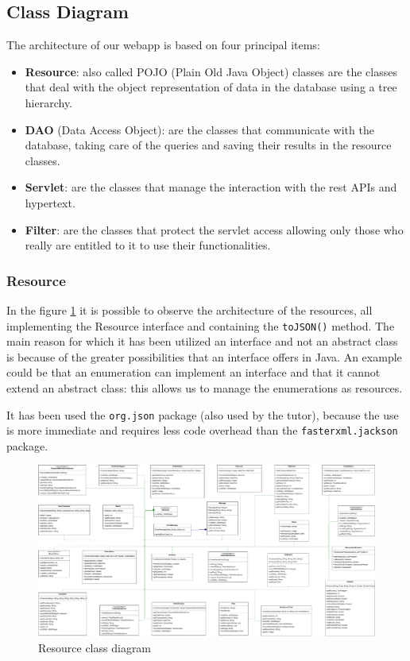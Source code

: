 \subsection{Class Diagram}

The architecture of our webapp is based on four principal items:
\begin{itemize}
    \item \textbf{Resource}: also called POJO (Plain Old Java Object) classes are the classes that deal with the object representation of data in the database using a tree hierarchy.
    \item \textbf{DAO} (Data Access Object): are the classes that communicate with the database, taking care of the queries and saving their results in the resource classes.
    \item \textbf{Servlet}: are the classes that manage the interaction with the rest APIs and hypertext.
    \item \textbf{Filter}: are the classes that protect the servlet access allowing only those who really are entitled to it to use their functionalities.
\end{itemize}

\subsubsection*{Resource}

In the figure \ref{fig:ResouceClassDiagram} it is possible to observe the 
architecture of the resources, all implementing the Resource interface
and containing the \texttt{toJSON()} method.
The main reason for which it has been utilized an interface and not an abstract
class is because of the greater possibilities that an interface offers in
Java. An example could be that an enumeration can implement an interface and that it cannot
extend an abstract class: this allows us to manage the enumerations
as resources.

It has been used the \texttt{org.json} package (also used by the tutor), because the
use is more  immediate and requires less code overhead than the
\texttt{fasterxml.jackson} package.


\begin{figure}
    \centering
    \includegraphics[width=1.1\textwidth,height=\textheight,keepaspectratio]{Schemas/resources.drawio.pdf}
    \caption{Resource class diagram}
    \label{fig:ResouceClassDiagram}
\end{figure}

